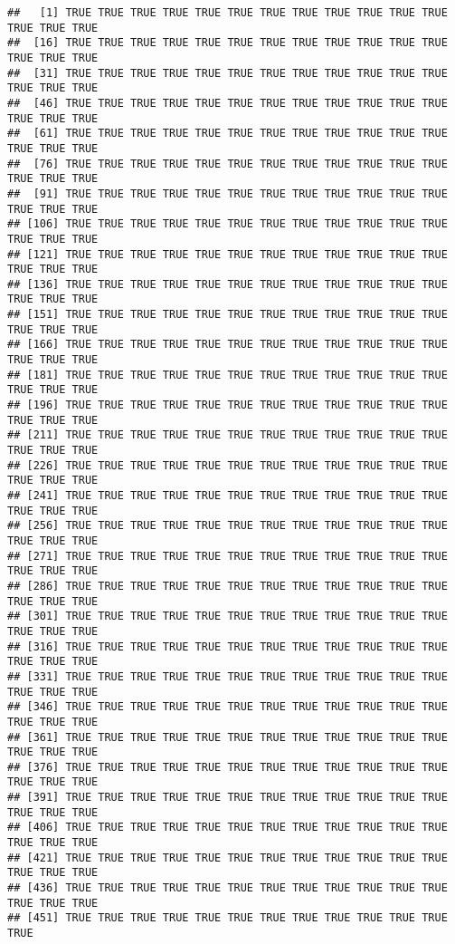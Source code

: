 \documentclass[
]{article}
\begin{document}
\begin{verbatim}
##   [1] TRUE TRUE TRUE TRUE TRUE TRUE TRUE TRUE TRUE TRUE TRUE TRUE TRUE TRUE TRUE
##  [16] TRUE TRUE TRUE TRUE TRUE TRUE TRUE TRUE TRUE TRUE TRUE TRUE TRUE TRUE TRUE
##  [31] TRUE TRUE TRUE TRUE TRUE TRUE TRUE TRUE TRUE TRUE TRUE TRUE TRUE TRUE TRUE
##  [46] TRUE TRUE TRUE TRUE TRUE TRUE TRUE TRUE TRUE TRUE TRUE TRUE TRUE TRUE TRUE
##  [61] TRUE TRUE TRUE TRUE TRUE TRUE TRUE TRUE TRUE TRUE TRUE TRUE TRUE TRUE TRUE
##  [76] TRUE TRUE TRUE TRUE TRUE TRUE TRUE TRUE TRUE TRUE TRUE TRUE TRUE TRUE TRUE
##  [91] TRUE TRUE TRUE TRUE TRUE TRUE TRUE TRUE TRUE TRUE TRUE TRUE TRUE TRUE TRUE
## [106] TRUE TRUE TRUE TRUE TRUE TRUE TRUE TRUE TRUE TRUE TRUE TRUE TRUE TRUE TRUE
## [121] TRUE TRUE TRUE TRUE TRUE TRUE TRUE TRUE TRUE TRUE TRUE TRUE TRUE TRUE TRUE
## [136] TRUE TRUE TRUE TRUE TRUE TRUE TRUE TRUE TRUE TRUE TRUE TRUE TRUE TRUE TRUE
## [151] TRUE TRUE TRUE TRUE TRUE TRUE TRUE TRUE TRUE TRUE TRUE TRUE TRUE TRUE TRUE
## [166] TRUE TRUE TRUE TRUE TRUE TRUE TRUE TRUE TRUE TRUE TRUE TRUE TRUE TRUE TRUE
## [181] TRUE TRUE TRUE TRUE TRUE TRUE TRUE TRUE TRUE TRUE TRUE TRUE TRUE TRUE TRUE
## [196] TRUE TRUE TRUE TRUE TRUE TRUE TRUE TRUE TRUE TRUE TRUE TRUE TRUE TRUE TRUE
## [211] TRUE TRUE TRUE TRUE TRUE TRUE TRUE TRUE TRUE TRUE TRUE TRUE TRUE TRUE TRUE
## [226] TRUE TRUE TRUE TRUE TRUE TRUE TRUE TRUE TRUE TRUE TRUE TRUE TRUE TRUE TRUE
## [241] TRUE TRUE TRUE TRUE TRUE TRUE TRUE TRUE TRUE TRUE TRUE TRUE TRUE TRUE TRUE
## [256] TRUE TRUE TRUE TRUE TRUE TRUE TRUE TRUE TRUE TRUE TRUE TRUE TRUE TRUE TRUE
## [271] TRUE TRUE TRUE TRUE TRUE TRUE TRUE TRUE TRUE TRUE TRUE TRUE TRUE TRUE TRUE
## [286] TRUE TRUE TRUE TRUE TRUE TRUE TRUE TRUE TRUE TRUE TRUE TRUE TRUE TRUE TRUE
## [301] TRUE TRUE TRUE TRUE TRUE TRUE TRUE TRUE TRUE TRUE TRUE TRUE TRUE TRUE TRUE
## [316] TRUE TRUE TRUE TRUE TRUE TRUE TRUE TRUE TRUE TRUE TRUE TRUE TRUE TRUE TRUE
## [331] TRUE TRUE TRUE TRUE TRUE TRUE TRUE TRUE TRUE TRUE TRUE TRUE TRUE TRUE TRUE
## [346] TRUE TRUE TRUE TRUE TRUE TRUE TRUE TRUE TRUE TRUE TRUE TRUE TRUE TRUE TRUE
## [361] TRUE TRUE TRUE TRUE TRUE TRUE TRUE TRUE TRUE TRUE TRUE TRUE TRUE TRUE TRUE
## [376] TRUE TRUE TRUE TRUE TRUE TRUE TRUE TRUE TRUE TRUE TRUE TRUE TRUE TRUE TRUE
## [391] TRUE TRUE TRUE TRUE TRUE TRUE TRUE TRUE TRUE TRUE TRUE TRUE TRUE TRUE TRUE
## [406] TRUE TRUE TRUE TRUE TRUE TRUE TRUE TRUE TRUE TRUE TRUE TRUE TRUE TRUE TRUE
## [421] TRUE TRUE TRUE TRUE TRUE TRUE TRUE TRUE TRUE TRUE TRUE TRUE TRUE TRUE TRUE
## [436] TRUE TRUE TRUE TRUE TRUE TRUE TRUE TRUE TRUE TRUE TRUE TRUE TRUE TRUE TRUE
## [451] TRUE TRUE TRUE TRUE TRUE TRUE TRUE TRUE TRUE TRUE TRUE TRUE TRUE
\end{verbatim}
\end{document}
